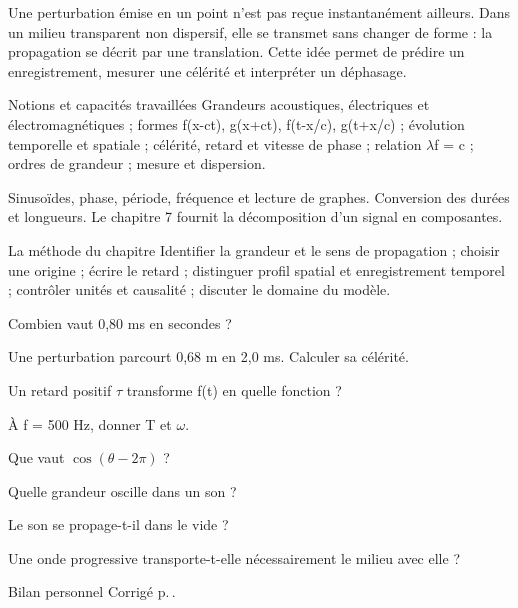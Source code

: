 Une perturbation émise en un point n’est pas reçue instantanément ailleurs. Dans un milieu transparent non dispersif, elle se transmet sans changer de forme : la propagation se décrit par une translation. Cette idée permet de prédire un enregistrement, mesurer une célérité et interpréter un déphasage.
\begin{loi}{Notions et capacités travaillées}
Grandeurs acoustiques, électriques et électromagnétiques ; formes f(x-ct), g(x+ct), f(t-x/c), g(t+x/c) ; évolution temporelle et spatiale ; célérité, retard et vitesse de phase ; relation \ensuremath{\lambda}f = c ; ordres de grandeur ; mesure et dispersion.
\end{loi}

Sinusoïdes, phase, période, fréquence et lecture de graphes. Conversion des durées et longueurs. Le chapitre 7 fournit la décomposition d’un signal en composantes.

\begin{methode}{La méthode du chapitre}
Identifier la grandeur et le sens de propagation ; choisir une origine ; écrire le retard ; distinguer profil spatial et enregistrement temporel ; contrôler unités et causalité ; discuter le domaine du modèle.
\end{methode}


\begin{questions}
\item Combien vaut 0,80 ms en secondes ?
\item Une perturbation parcourt 0,68 m en 2,0 ms. Calculer sa célérité.
\item Un retard positif \ensuremath{\tau} transforme f(t) en quelle fonction ?
\item À f = 500 Hz, donner T et \ensuremath{\omega}.
\item Que vaut $\cos(\theta-2\pi)$ ?
\item Quelle grandeur oscille dans un son ?
\item Le son se propage-t-il dans le vide ?
\item Une onde progressive transporte-t-elle nécessairement le milieu avec elle ?
\end{questions}
\begin{docu}{Bilan personnel}
Corrigé p.\,\pageref{ch08-corr-diag}.
\end{docu}


